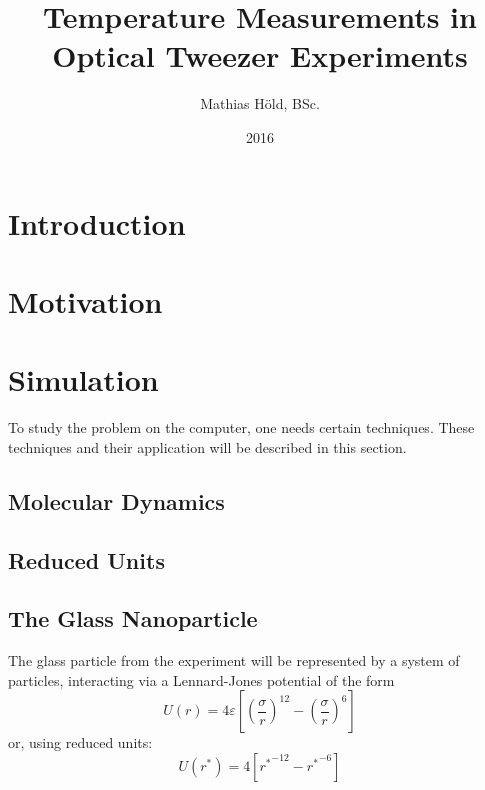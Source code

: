 \documentclass[12pt]{article}
\begin{document}
\title{Temperature Measurements in Optical Tweezer Experiments}
\author{Mathias H\"old, BSc.}
\date{2016}
\maketitle
\thispagestyle{empty}
\newpage
\section{Introduction}





\newpage
\section{Motivation}






\newpage
\section{Simulation}
To study the problem on the computer, one needs certain techniques. These techniques and their application will be described in this section.

\subsection{Molecular Dynamics}



\subsection{Reduced Units}
\subsection{The Glass Nanoparticle}
The glass particle from the experiment will be represented by a system of particles, interacting via a Lennard-Jones potential of the form
\begin{equation}
    U(r) = 4\varepsilon\left[\left(\frac\sigma r\right)^{12} - \left(\frac\sigma r\right)^6\right]
\end{equation}
or, using reduced units:
\begin{equation}
    U(r^*) = 4\left[{r^*}^{-12} - {r^*}^{-6}\right]
\end{equation}
\end{document}
